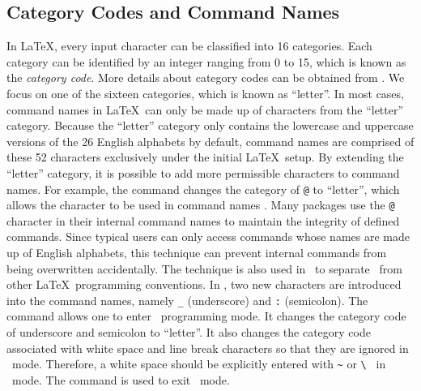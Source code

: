\documentclass{ltugboat}
\begin{document}
\subsection{Category Codes and Command Names}
In \LaTeX, every input character can be classified into 16 categories. 
Each category can be identified by an integer ranging from 0 to 15, which is known as the \emph{category code}.
More details about category codes can be obtained from \cite{overleaf-catcode}.
We focus on one of the sixteen categories, which is known as ``letter''.
In most cases, command names in \LaTeX\ can only be made up of characters from the ``letter'' category.
Because the ``letter'' category only contains the lowercase and uppercase versions of the 26 English alphabets by default, command names are comprised of these 52 characters exclusively under the initial \LaTeX\ setup.
By extending the ``letter'' category, it is possible to add more permissible characters to command names.
For example, the  command changes the category of \texttt{@} to ``letter'', which allows the character to be used in command names \cite{texse:makeatletter}. 
Many packages use the \texttt{@} character in their internal command names to maintain the integrity of defined commands.
Since typical users can only access commands whose names are made up of English alphabets, this technique can prevent internal commands from being overwritten accidentally.
The technique is also used in \liii\ to separate \liii\ from other \LaTeX\ programming conventions.
In \liii, two new characters are introduced into the command names, namely \texttt{\_} (underscore) and \texttt{:} (semicolon).
The command  allows one to enter \liii\ programming mode.
It changes the category code of underscore and semicolon to ``letter''.
It also changes the category code associated with white space and line break characters so that they are ignored in \liii\ mode.
Therefore, a white space should be explicitly entered with \verb|~| or \verb|\ | in \liii\ mode.
The command  is used to exit \liii\ mode.
\end{document}
